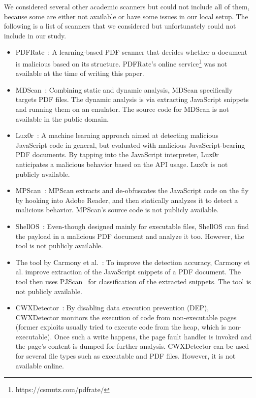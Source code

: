 We considered several other academic scanners but could not include all of them, because some are either not available or have some issues in our local setup. The following is a list of scanners that we considered but unfortunately could not include in our study.
\begin{itemize}
    \item PDFRate~\cite{smutz2012malicious}: A learning-based PDF scanner that decides whether a document is malicious based on its structure. PDFRate's online service\footnote{https://csmutz.com/pdfrate/} was not available at the time of writing this paper.
    \item MDScan~\cite{tzermias2011combining}: Combining static and dynamic analysis, MDScan specifically targets PDF files. The dynamic analysis is via extracting JavaScript snippets and running them on an emulator. The source code for MDScan is not available in the public domain.
    \item Lux0r~\cite{corona2014lux0r}: A machine learning approach aimed at detecting malicious JavaScript code in general, but  evaluated with malicious JavaScript-bearing PDF documents. By tapping into the JavaScript interpreter, Lux0r anticipates a malicious behavior based on the API usage. Lux0r is not publicly available.
    \item MPScan~\cite{lu2013obfuscation}: MPScan extracts and de-obfuscates the JavaScript code on the fly by hooking into Adobe Reader, and then statically analyzes it to detect a malicious behavior. MPScan's source code is not publicly available.
    \item ShellOS~\cite{snow2011shellos}: Even-though designed mainly for executable files, ShellOS can find the payload in a malicious PDF document and analyze it too. However, the tool is not publicly available.
    \item The tool by Carmony et al.~\cite{carmony2016extract}: To improve the detection accuracy, Carmony et al. improve extraction of the JavaScript snippets of a PDF document. The tool then uses PJScan~\cite{laskov2011static} for classification of the extracted snippets. The tool is not publicly available.
    \item CWXDetector~\cite{willems2012using}: By disabling data execution prevention (DEP), CWXDetector monitors the execution of code from non-executable pages (former exploits usually tried to execute code from the heap, which is non-executable). Once such a write happens, the page fault handler is invoked and the page's content is dumped for further analysis. CWXDetector can be used for several file types such as executable and PDF files. However, it is not available online.

\end{itemize}

